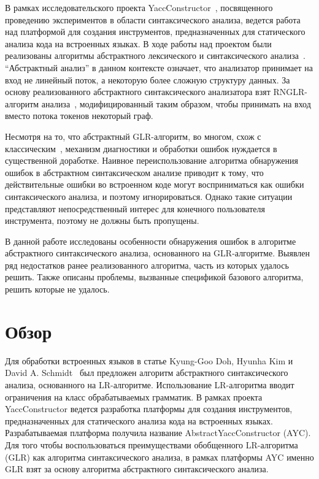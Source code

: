 В рамках исследовательского проекта YaccConstructor~\cite{YaccConstructor}, посвященного проведению 
экспериментов в области синтаксического анализа, ведется работа над платформой 
для создания инструментов, предназначенных для статического анализа кода на встроенных
языках. В ходе работы над проектом были реализованы алгоритмы абстрактного 
лексического и синтаксического анализа~\cite{grigorev2013glr}. “Абстрактный анализ” в данном контексте 
означает, что анализатор принимает на вход не линейный поток, а некоторую более 
сложную структуру данных. За основу реализованного абстрактного синтаксического 
анализатора взят RNGLR-алгоритм анализа~\cite{Scott:2006:RNG:1146809.1146810}, модифицированный таким образом, чтобы 
принимать на вход вместо потока токенов некоторый граф.

Несмотря на то, что абстрактный GLR-алгоритм, во многом, схож с классическим~\cite{grigorev2013glr}, 
механизм диагностики и обработки ошибок нуждается в существенной доработке. 
Наивное переиспользование алгоритма обнаружения ошибок в  абстрактном синтаксическом 
анализе приводит к тому, что действительные ошибки во встроенном коде могут 
восприниматься как ошибки синтаксического анализа, и поэтому игнорироваться. 
Однако такие ситуации представляют непосредственный интерес для конечного пользователя 
инструмента, поэтому не должны быть пропущены. 

В данной работе исследованы особенности обнаружения ошибок в алгоритме абстрактного 
синтаксического анализа, основанного на GLR-алгоритме. Выявлен ряд недостатков 
ранее реализованного алгоритма, часть из которых удалось решить. Также описаны 
проблемы, вызванные спецификой базового алгоритма, решить которые не удалось. 

\section{Обзор}
Для обработки встроенных языков в статье Kyung-Goo Doh, Hyunha Kim и David A. 
Schmidt~\cite{Doh:2011:AL:2074591.2074599} был предложен алгоритм абстрактного 
синтаксического анализа, основанного на LR-алгоритме. Использование LR-алгоритма
вводит ограничения на класс обрабатываемых грамматик. В рамках проекта 
YaccConstructor ведется разработка платформы для создания инструментов, 
предназначенных для статического анализа кода на встроенных языках. Разрабатываемая 
платформа получила название AbstractYaccConstructor (AYC). Для того чтобы 
воспользоваться преимуществами обобщенного LR-алгоритма (GLR) как алгоритма 
синтаксического анализа, в рамках платформы AYC именно GLR взят за основу алгоритма 
абстрактного синтаксического анализа. 

